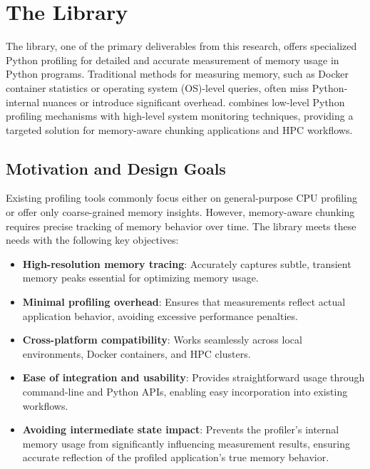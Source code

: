 \section{The \traceq Library}
\label{sec:mmc-traceq}

The \traceq library, one of the primary deliverables from this research, offers specialized Python profiling for detailed and accurate measurement of memory usage in Python programs.
Traditional methods for measuring memory, such as Docker container statistics or operating system (\ac{OS})-level queries, often miss Python-internal nuances or introduce significant overhead.
\traceq combines low-level Python profiling mechanisms with high-level system monitoring techniques, providing a targeted solution for memory-aware chunking applications and \ac{HPC} workflows.

\subsection{Motivation and Design Goals}
\label{sec:mmc-traceq-motivation}

Existing profiling tools commonly focus either on general-purpose \ac{CPU} profiling or offer only coarse-grained memory insights.
However, memory-aware chunking requires precise tracking of memory behavior over time.
The \traceq library meets these needs with the following key objectives:

\begin{itemize}
    \item \textbf{High-resolution memory tracing}: Accurately captures subtle, transient memory peaks essential for optimizing memory usage.
    \item \textbf{Minimal profiling overhead}: Ensures that measurements reflect actual application behavior, avoiding excessive performance penalties.
    \item \textbf{Cross-platform compatibility}: Works seamlessly across local environments, Docker containers, and \ac{HPC} clusters.
    \item \textbf{Ease of integration and usability}: Provides straightforward usage through command-line and Python \ac{API}s, enabling easy incorporation into existing workflows.
    \item \textbf{Avoiding intermediate state impact}: Prevents the profiler’s internal memory usage from significantly influencing measurement results, ensuring accurate reflection of the profiled application's true memory behavior.
\end{itemize}

